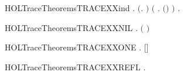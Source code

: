 \newcommand{\HOLTraceTheoremsTRACEXXcasesXXtwice}{\UseVerbatim{HOLTraceTheoremsTRACEXXcasesXXtwice}}
\begin{SaveVerbatim}{HOLTraceTheoremsTRACEXXind}
\HOLTokenTurnstile{} \HOLSymConst{\HOLTokenForall{}}.
       \ensuremath{(}\HOLSymConst{\HOLTokenForall{}}.   \HOLConst{\ensuremath{\epsilon}} \ensuremath{)} \HOLSymConst{\HOLTokenConj{}}
       \ensuremath{(}\HOLSymConst{\HOLTokenForall{}}    .  \HOLTokenTransBegin{}\HOLTokenTransEnd {} \HOLSymConst{\HOLTokenConj{}}     \HOLSymConst{\HOLTokenImp{}}   \ensuremath{(}\HOLSymConst{::}\ensuremath{)} \ensuremath{)} \HOLSymConst{\HOLTokenImp{}}
       \HOLSymConst{\HOLTokenForall{}}  .     \HOLSymConst{\HOLTokenImp{}}    
\end{SaveVerbatim}
\newcommand{\HOLTraceTheoremsTRACEXXind}{\UseVerbatim{HOLTraceTheoremsTRACEXXind}}
\begin{SaveVerbatim}{HOLTraceTheoremsTRACEXXNIL}
\HOLTokenTurnstile{} \HOLSymConst{\HOLTokenForall{}} .   \HOLConst{\ensuremath{\epsilon}}  \HOLSymConst{\HOLTokenEquiv{}} \ensuremath{(} \HOLSymConst{\ensuremath{=}} \ensuremath{)}
\end{SaveVerbatim}
\newcommand{\HOLTraceTheoremsTRACEXXNIL}{\UseVerbatim{HOLTraceTheoremsTRACEXXNIL}}
\begin{SaveVerbatim}{HOLTraceTheoremsTRACEXXONE}
\HOLTokenTurnstile{} \HOLSymConst{\HOLTokenForall{}}  .   \ensuremath{[}\ensuremath{]}  \HOLSymConst{\HOLTokenEquiv{}}  \HOLTokenTransBegin{}\HOLTokenTransEnd {}
\end{SaveVerbatim}
\newcommand{\HOLTraceTheoremsTRACEXXONE}{\UseVerbatim{HOLTraceTheoremsTRACEXXONE}}
\begin{SaveVerbatim}{HOLTraceTheoremsTRACEXXREFL}
\HOLTokenTurnstile{} \HOLSymConst{\HOLTokenForall{}}.   \HOLConst{\ensuremath{\epsilon}} 
\end{SaveVerbatim}
